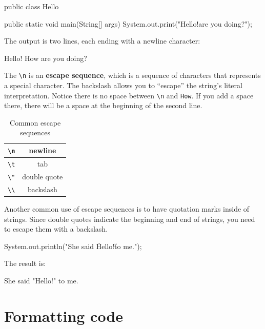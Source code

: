 \documentclass[12pt]{book}
\theoremstyle{exercise}
\begin{document}
\begin{code}
public class Hello {

    public static void main(String[] args) {
        System.out.print("Hello!\nHow are you doing?\n");
    }
}
\end{code}

The output is two lines, each ending with a newline character:

\begin{stdout}
Hello!
How are you doing?
\end{stdout}


The \verb"\n" is an {\bf escape sequence}, which is a sequence of characters that represents a special character.
The backslash allows you to ``escape'' the string's literal interpretation.
Notice there is no space between \verb"\n" and \verb"How".
If you add a space there, there will be a space at the beginning of the second line.

\begin{table}[!ht]
\begin{center}
\begin{tabular}{|c|c|}
\hline
\verb"\n" & newline \\
\hline
\verb"\t" & tab \\
\hline
\verb'\"' & double quote \\
\hline
\verb"\\" & backslash \\
\hline
\end{tabular}
\caption{Common escape sequences}
\end{center}
\end{table}

Another common use of escape sequences is to have quotation marks inside of strings.
Since double quotes indicate the beginning and end of strings, you need to escape them with a backslash.

\begin{code}
    System.out.println("She said \"Hello!\" to me.");
\end{code}

The result is:

\begin{stdout}
She said "Hello!" to me.
\end{stdout}


\section{Formatting code}
\label{formatting}
\end{document}
